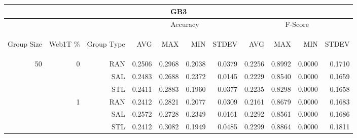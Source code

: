 \begin{center}
\begin{table}[htbp]
\begin{tabular}{ | r | r | r | r | r | r | r | r | r | r | r |}
\hline
\multicolumn{11}{|c|}{GB3}\\
\hline
 & & & \multicolumn{4}{|c|}{Accuracy} & \multicolumn{4}{|c|}{F-Score}\\ \cline{4-11}
\begin{sideways}Group Size\end{sideways} & \begin{sideways}Web1T \%\end{sideways} & \begin{sideways}Group Type\end{sideways} & \begin{sideways}AVG\end{sideways} & \begin{sideways}MAX\end{sideways} & \begin{sideways}MIN\end{sideways} & \begin{sideways}STDEV\end{sideways} & \begin{sideways}AVG\end{sideways} & \begin{sideways}MAX\end{sideways} & \begin{sideways}MIN\end{sideways} & \begin{sideways}STDEV\end{sideways}\\
\hline
\multirow{12}{*}{50}
 & \multirow{3}{*}{0} & RAN & 0.2506 & 0.2968 & 0.2038 & 0.0379 & 0.2256 & 0.8992 & 0.0000 & 0.1710\\ \cline{3-11}
 &   & SAL & 0.2483 & 0.2688 & 0.2372 & 0.0145 & 0.2229 & 0.8540 & 0.0000 & 0.1659\\ \cline{3-11}
 &   & STL & 0.2411 & 0.2883 & 0.1960 & 0.0377 & 0.2235 & 0.8298 & 0.0000 & 0.1658\\ \cline{2-11}
 & \multirow{3}{*}{1} & RAN & 0.2412 & 0.2821 & 0.2077 & 0.0309 & 0.2161 & 0.8679 & 0.0000 & 0.1683\\ \cline{3-11}
 &   & SAL & 0.2572 & 0.2728 & 0.2349 & 0.0161 & 0.2292 & 0.8561 & 0.0000 & 0.1686\\ \cline{3-11}
 &   & STL & 0.2412 & 0.3082 & 0.1949 & 0.0485 & 0.2299 & 0.8864 & 0.0000 & 0.1811\\ \cline{2-11}

\end{tabular}
\end{table}
\end{center}
